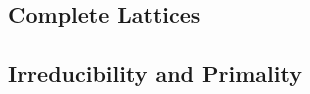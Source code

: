 \documentclass{book}
\begin{document}
	
	
	
	
	
	
	
	
	
	
	
	
	
	
	
	
	
	
	
	
	
	
	
	
	
	
	
	
	
	
	
	
	
	
	
	
	
	
	
	
	
	
	
	\subsection{Complete Lattices}
	
	
	
	
	
	
	
	
	
	
	
	
	
	
	
	
	
	
	
	
	
	
	
	
	
	
	
	
	
	
	
	
	
	
	
	
	
	
	
	
	
	
	
	
	
	
	
	
	
	\subsection{Irreducibility and Primality}
	
\end{document}
